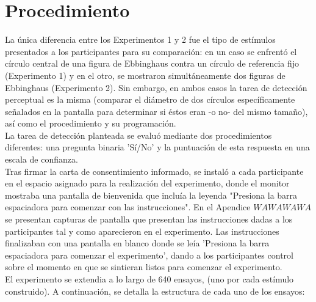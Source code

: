 \section{Procedimiento}

La única diferencia entre los Experimentos 1 y 2 fue el tipo de estímulos presentados a los participantes para su comparación: en un caso se enfrentó el círculo central de una figura de Ebbinghaus contra un círculo de referencia fijo (Experimento 1) y en el otro, se mostraron simultáneamente dos figuras de Ebbinghaus (Experimento 2). Sin embargo, en ambos casos la tarea de detección perceptual es la misma (comparar el diámetro de dos círculos específicamente señalados en la pantalla para determinar si éstos eran -o no- del mismo tamaño), así como el procedimiento y su programación.\\

La tarea de detección planteada se evaluó mediante dos procedimientos diferentes: una pregunta binaria 'Sí/No' y la puntuación de esta respuesta en una escala de confianza.\\

Tras firmar la carta de consentimiento informado, se instaló a cada participante en el espacio asignado para la realización del experimento, donde el monitor mostraba una pantalla de bienvenida que incluía la leyenda "Presiona la barra espaciadora para comenzar con las instrucciones". En el Apendice $WAWAWAWA$ se presentan capturas de pantalla que presentan las instrucciones dadas a los participantes tal y como aparecieron en el experimento. Las instrucciones finalizaban con una pantalla en blanco donde se leía 'Presiona la barra espaciadora para comenzar el experimento', dando a los participantes control sobre el momento en que se sintieran listos para comenzar el experimento.\\

El experimento se extendia a lo largo de 640 ensayos, (uno por cada estímulo construido). A continuación, se detalla la estructura de cada uno de los ensayos:\\


